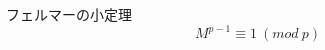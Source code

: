 \documentclass[fleqn,leqno,autodetect-engine,dvipdfmxi-if-dvi,ja=standard]{bxjsarticle}
\begin{document}
フェルマーの小定理
\begin{displaymath}
M^{p-1} \equiv 1\ (mod\ p)
\end{displaymath}
\end{document}
